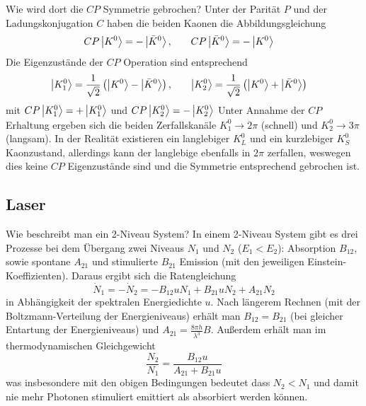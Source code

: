 \begin{fquestion}{Wie wird dort die $CP$ Symmetrie gebrochen?}
    Unter der Parität $P$ und der Ladungskonjugation $C$ haben die beiden Kaonen die Abbildungsgleichung
    $$
    \begin{aligned}
        CP \ket{K^0} &= -\ket{\bar{K}^0}, &&& CP \ket{\bar{K}^0} &= -\ket{K^0}
    \end{aligned}
    $$
    Die Eigenzustände der $CP$ Operation sind entsprechend
    $$
    \begin{aligned}
        \ket{K_1^0} &= \frac{1}{\sqrt{2}} \left(\ket{K^0} - \ket{\bar{K}^0} \right), &&& \ket{K_2^0} &= \frac{1}{\sqrt{2}} \left(\ket{K^0} + \ket{\bar{K}^0} \right)
    \end{aligned}
    $$
    mit
    \(CP\ket{K_1^0} = + \ket{K_1^0}\) und \(CP\ket{K_2^0} = -\ket{K_2^0}\)
    Unter Annahme der $CP$ Erhaltung ergeben sich die beiden Zerfallskanäle $K_1^0 \rightarrow 2 \pi$ (schnell) und $K_2^0 \rightarrow 3\pi$ (langsam).
    In der Realität existieren ein langlebiger $K^0_L$ und ein kurzlebiger $K^0_S$ Kaonzustand, allerdings kann der langlebige ebenfalls in $2\pi$ zerfallen, weswegen dies keine $CP$ Eigenzustände sind und die Symmetrie entsprechend gebrochen ist.
\end{fquestion}


\subsection{Laser}

\begin{fquestion}{Wie beschreibt man ein 2-Niveau System?}
    In einem 2-Niveau System gibt es drei Prozesse bei dem Übergang zwei Niveaus $N_1$ und $N_2$ ($E_1 < E_2$): Absorption $B_{12}$, sowie spontane $A_{21}$ und stimulierte $B_{21}$ Emission (mit den jeweiligen Einstein-Koeffizienten).
    Daraus ergibt sich die Ratengleichung
    $$\dot{N}_1 = -\dot{N}_2 = -B_{12} u N_1 + B_{21} u N_2 + A_{21} N_2$$
    in Abhängigkeit der spektralen Energiedichte $u$.
    Nach längerem Rechnen (mit der Boltzmann-Verteilung der Energieniveaus) erhält man $B_{12} = B_{21}$ (bei gleicher Entartung der Energieniveaus) und $A_{21} = \frac{8\pi h}{\lambda^3} B$.
    Außerdem erhält man im thermodynamischen Gleichgewicht 
    $$\frac{N_2}{N_1} = \frac{B_{12} u}{A_{21} + B_{21} u}$$
    was insbesondere mit den obigen Bedingungen bedeutet dass $N_2 < N_1$ und damit nie mehr Photonen stimuliert emittiert als absorbiert werden können.
\end{fquestion}

